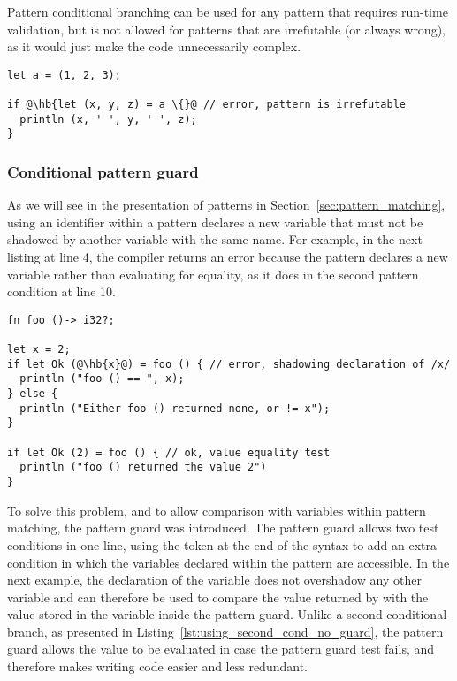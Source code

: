 Pattern conditional branching can be used for any pattern that requires run-time
validation, but is not allowed for patterns that are irrefutable (or always
wrong), as it would just make the code unnecessarily complex.

\begin{lstlisting}[style=coloredverbatim, escapechar=@]
let a = (1, 2, 3);

if @\hb{let (x, y, z) = a \{}@ // error, pattern is irrefutable
  println (x, ' ', y, ' ', z);
}
\end{lstlisting}

\subsubsection{Conditional pattern guard}

As we will see in the presentation of patterns in
Section~\ref{sec:pattern_matching}, using an identifier within a pattern
declares a new variable that must not be shadowed by another variable with the
same name. For example, in the next listing at line 4, the compiler returns an
error because the pattern declares a new variable  rather than
evaluating for equality, as it does in the second pattern condition at line 10.

\begin{lstlisting}[style=coloredverbatim, escapechar=@]
fn foo ()-> i32?;

let x = 2;
if let Ok (@\hb{x}@) = foo () { // error, shadowing declaration of /x/
  println ("foo () == ", x);
} else {
  println ("Either foo () returned none, or != x");
}

if let Ok (2) = foo () { // ok, value equality test
  println ("foo () returned the value 2")
}
\end{lstlisting}

To solve this problem, and to allow comparison with variables within pattern
matching, the pattern guard was introduced. The pattern guard allows two test
conditions in one line, using the token \token{\&\&} at the end of the syntax
 to add an extra condition in which the
variables declared within the pattern are accessible. In the next example, the
declaration of the variable  does not overshadow any other variable and
can therefore be used to compare the value returned by  with the
value stored in the variable  inside the pattern guard. Unlike a second
conditional branch, as presented in
Listing~\ref{lst:using_second_cond_no_guard}, the pattern guard allows the
 value to be evaluated in case the pattern guard test fails, and
therefore makes writing code easier and less redundant.

